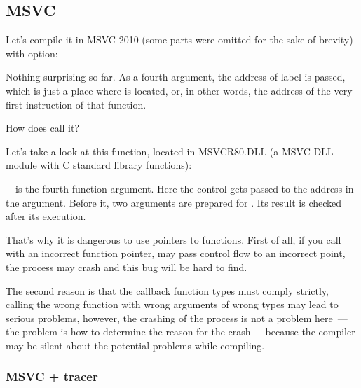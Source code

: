 

\subsection{MSVC}

Let's compile it in MSVC 2010 (some parts were omitted for the sake of brevity) with \TT{\Ox} option:



Nothing surprising so far.
As a fourth argument, the address of label  is passed, which is just a place
where \comp is located, or, in other words, the address of the very first instruction of 
that function.

How does \qsort call it?


Let's take a look at this function, located in MSVCR80.DLL (a MSVC DLL module with C standard library functions):



---is the fourth function argument.
Here the control gets passed to the address in the  argument.
Before it, two arguments are prepared for \comp. Its result is checked after its execution.

That's why it is dangerous to use pointers to functions.
First of all, if you call \qsort with an incorrect function pointer, \qsort may pass control flow
to an incorrect point, the process may crash and this bug will be hard to find.

The second reason is that the callback function types must comply strictly, calling the wrong function
with wrong arguments of wrong types may lead to serious problems, however, the crashing of the process is not a 
problem here~---the problem is how to determine the reason for the crash~---because the compiler may be 
silent about the potential problems while compiling.



\subsubsection{MSVC + tracer}

